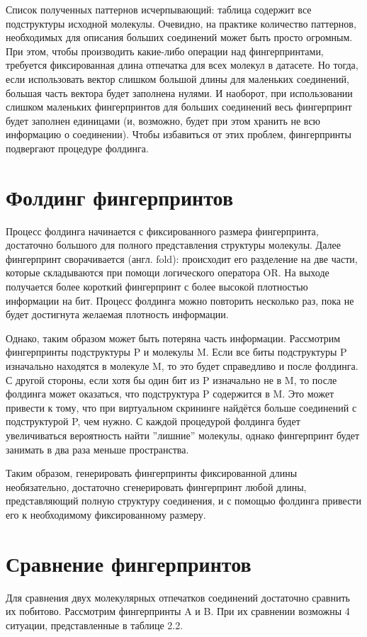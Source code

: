 \documentclass[a4paper,14pt]{extreport}
\begin{document}
Список полученных паттернов исчерпывающий: таблица содержит все подструктуры исходной молекулы. Очевидно, на практике количество паттернов, необходимых для описания больших соединений может быть просто огромным. При этом, чтобы производить какие-либо операции над фингерпринтами, требуется фиксированная длина отпечатка для всех молекул в датасете. Но тогда, если использовать вектор слишком большой длины для маленьких соединений, большая часть вектора будет заполнена нулями. И наоборот, при использовании слишком маленьких фингерпринтов для больших соединений весь фингерпринт будет заполнен единицами (и, возможно, будет при этом хранить не всю информацию о соединении). Чтобы избавиться от этих проблем, фингерпринты подвергают процедуре фолдинга.


  \section{Фолдинг фингерпринтов}
  \label{s:fp_folding_sec}
 Процесс фолдинга начинается с фиксированного размера фингерпринта, достаточно большого для полного представления структуры молекулы. Далее фингерпринт сворачивается (англ. fold): происходит его разделение на две части, которые складываются при помощи логического оператора OR. На выходе получается более короткий фингерпринт с более высокой плотностью информации на бит. Процесс фолдинга можно повторить несколько раз, пока не будет достигнута желаемая плотность информации.
 
Однако, таким образом может быть потеряна часть информации. Рассмотрим фингерпринты подструктуры P и молекулы M. Если все биты подструктуры P изначально находятся в молекуле M, то это будет справедливо и после фолдинга. С другой стороны, если хотя бы один бит из P изначально не в M, то после фолдинга может оказаться, что подструктура P содержится в M. Это может привести к тому, что при виртуальном скрининге найдётся больше соединений с подструктурой P, чем нужно. С каждой процедурой фолдинга будет увеличиваться вероятность найти ''лишние'' молекулы, однако фингерпринт будет занимать в два раза меньше пространства.

Таким образом, генерировать фингерпринты фиксированной длины необязательно, достаточно сгенерировать фингерпринт любой длины, представляющий полную структуру соединения, и с помощью фолдинга привести его к необходимому фиксированному размеру. 
 
  
  \section{Сравнение фингерпринтов}
  \label{s:fp_comparing_sec}
Для сравнения двух молекулярных отпечатков соединений достаточно сравнить их побитово. Рассмотрим фингерпринты A и B. При их сравнении возможны 4 ситуации, представленные в таблице 2.2.
  
\end{document}
